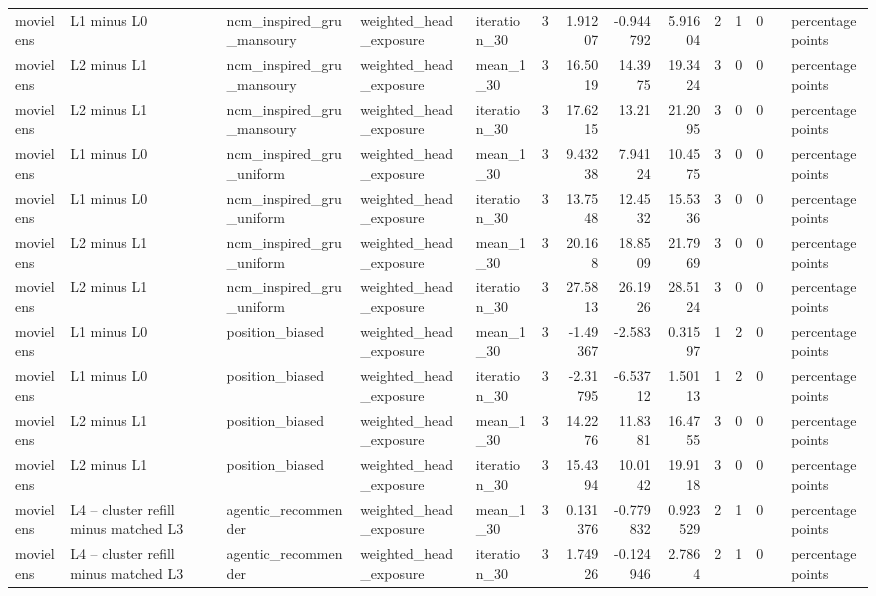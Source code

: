 \begin{table}[htbp!]
\begin{tabular}{lllllrrrrrrrll}
movielens & L1 minus L0 & ncm\_inspired\_gru\_mansoury & weighted\_head\_exposure & iteration\_30 & 3 & 1.91207 & -0.944792 & 5.91604 & 2 & 1 & 0 &  & percentage points \\
movielens & L2 minus L1 & ncm\_inspired\_gru\_mansoury & weighted\_head\_exposure & mean\_1\_30 & 3 & 16.5019 & 14.3975 & 19.3424 & 3 & 0 & 0 &  & percentage points \\
movielens & L2 minus L1 & ncm\_inspired\_gru\_mansoury & weighted\_head\_exposure & iteration\_30 & 3 & 17.6215 & 13.21 & 21.2095 & 3 & 0 & 0 &  & percentage points \\
movielens & L1 minus L0 & ncm\_inspired\_gru\_uniform & weighted\_head\_exposure & mean\_1\_30 & 3 & 9.43238 & 7.94124 & 10.4575 & 3 & 0 & 0 &  & percentage points \\
movielens & L1 minus L0 & ncm\_inspired\_gru\_uniform & weighted\_head\_exposure & iteration\_30 & 3 & 13.7548 & 12.4532 & 15.5336 & 3 & 0 & 0 &  & percentage points \\
movielens & L2 minus L1 & ncm\_inspired\_gru\_uniform & weighted\_head\_exposure & mean\_1\_30 & 3 & 20.168 & 18.8509 & 21.7969 & 3 & 0 & 0 &  & percentage points \\
movielens & L2 minus L1 & ncm\_inspired\_gru\_uniform & weighted\_head\_exposure & iteration\_30 & 3 & 27.5813 & 26.1926 & 28.5124 & 3 & 0 & 0 &  & percentage points \\
movielens & L1 minus L0 & position\_biased & weighted\_head\_exposure & mean\_1\_30 & 3 & -1.49367 & -2.583 & 0.31597 & 1 & 2 & 0 &  & percentage points \\
movielens & L1 minus L0 & position\_biased & weighted\_head\_exposure & iteration\_30 & 3 & -2.31795 & -6.53712 & 1.50113 & 1 & 2 & 0 &  & percentage points \\
movielens & L2 minus L1 & position\_biased & weighted\_head\_exposure & mean\_1\_30 & 3 & 14.2276 & 11.8381 & 16.4755 & 3 & 0 & 0 &  & percentage points \\
movielens & L2 minus L1 & position\_biased & weighted\_head\_exposure & iteration\_30 & 3 & 15.4394 & 10.0142 & 19.9118 & 3 & 0 & 0 &  & percentage points \\
movielens & L4 -- cluster refill minus matched L3 & agentic\_recommender & weighted\_head\_exposure & mean\_1\_30 & 3 & 0.131376 & -0.779832 & 0.923529 & 2 & 1 & 0 &  & percentage points \\
movielens & L4 -- cluster refill minus matched L3 & agentic\_recommender & weighted\_head\_exposure & iteration\_30 & 3 & 1.74926 & -0.124946 & 2.7864 & 2 & 1 & 0 &  & percentage points \\

\end{tabular}
\end{table}

